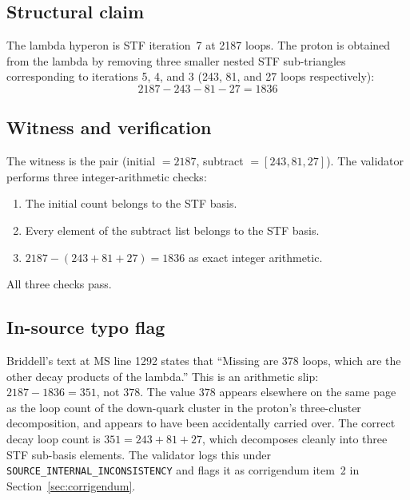 \documentclass[12pt,a4paper]{article}
\begin{document}
\subsection{Structural claim}

The lambda hyperon is STF iteration~7 at 2187 loops. The proton is
obtained from the lambda by removing three smaller nested STF
sub-triangles corresponding to iterations 5, 4, and 3 (243, 81, and
27 loops respectively):
\begin{equation}
  2187 - 243 - 81 - 27 = 1836
\end{equation}

\subsection{Witness and verification}

The witness is the pair (initial $= 2187$, subtract $= [243, 81, 27]$).
The validator performs three integer-arithmetic checks:
\begin{enumerate}[nosep]
  \item The initial count belongs to the STF basis.
  \item Every element of the subtract list belongs to the STF basis.
  \item $2187 - (243 + 81 + 27) = 1836$ as exact integer arithmetic.
\end{enumerate}
All three checks pass.

\subsection{In-source typo flag}

Briddell's text at MS line 1292 states that ``Missing are 378 loops,
which are the other decay products of the lambda.'' This is an
arithmetic slip: $2187 - 1836 = 351$, not $378$. The value $378$
appears elsewhere on the same page as the loop count of the
down-quark cluster in the proton's three-cluster decomposition, and
appears to have been accidentally carried over. The correct decay
loop count is $351 = 243 + 81 + 27$, which decomposes cleanly into
three STF sub-basis elements. The validator logs this under
\texttt{SOURCE\_INTERNAL\_INCONSISTENCY} and flags it as corrigendum
item~2 in Section~\ref{sec:corrigendum}.

\end{document}
